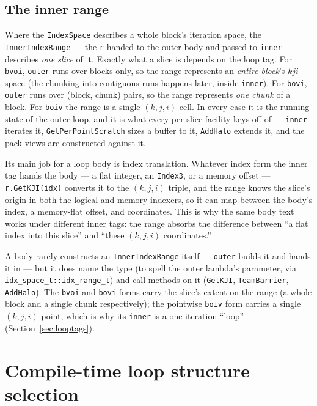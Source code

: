\documentclass[11pt]{article}
\newcommand{\code}[1]{\lstinline[basicstyle=\ttfamily]|#1|}
\begin{document}
\subsection{The inner range}
\label{sec:innerrange}

Where the \code{IndexSpace} describes a whole block's iteration space, the
\code{InnerIndexRange} --- the \code{r} handed to the outer body and passed to
\code{inner} --- describes \emph{one slice} of it. Exactly what a slice is depends
on the loop tag. For \code{bvoi}, \code{outer} runs over blocks only, so the range
represents an \emph{entire block}'s $kji$ space (the chunking into contiguous runs
happens later, inside \code{inner}). For \code{bovi}, \code{outer} runs over
(block, chunk) pairs, so the range represents \emph{one chunk} of a block. For
\code{boiv} the range is a single $(k,j,i)$ cell. In every case it is the running
state of the outer loop, and it is what every per-slice facility keys off of ---
\code{inner} iterates it, \code{GetPerPointScratch} sizes a buffer to it,
\code{AddHalo} extends it, and the pack views are constructed against it.

Its main job for a loop body is index translation. Whatever index form the inner
tag hands the body --- a flat integer, an \code{Index3}, or a memory offset ---
\code{r.GetKJI(idx)} converts it to the $(k,j,i)$ triple, and the range knows the
slice's origin in both the logical and memory indexers, so it can map between the
body's index, a memory-flat offset, and coordinates. This is why the same body
text works under different inner tags: the range absorbs the difference between
``a flat index into this slice'' and ``these $(k,j,i)$ coordinates.''

A body rarely constructs an \code{InnerIndexRange} itself --- \code{outer} builds
it and hands it in --- but it does name the type (to spell the outer lambda's
parameter, via \code{idx_space_t::idx_range_t}) and call methods on it
(\code{GetKJI}, \code{TeamBarrier}, \code{AddHalo}). The \code{bvoi} and \code{bovi}
forms carry the slice's extent on the range (a whole block and a single chunk
respectively); the pointwise \code{boiv} form carries a single $(k,j,i)$ point,
which is why its \code{inner} is a one-iteration ``loop''
(Section~\ref{sec:looptags}).

\section{Compile-time loop structure selection}
\label{sec:selection}
\end{document}
